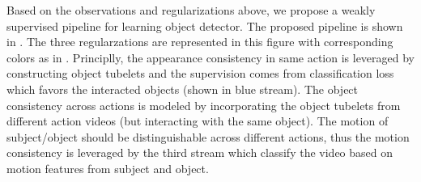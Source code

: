 Based on the observations and regularizations above, we propose a weakly supervised pipeline for learning object detector. The proposed pipeline is shown in . The three regularzations are represented in this figure with corresponding colors as in . Principlly, the appearance consistency in same action is leveraged by constructing object tubelets and the supervision comes from classification loss which favors the interacted objects (shown in blue stream). The object consistency across actions is modeled by incorporating the object tubelets from different action videos (but interacting with the same object). The motion of subject/object should be distinguishable across different actions, thus the motion consistency is leveraged by the third stream which classify the video based on motion features from subject and object. 



